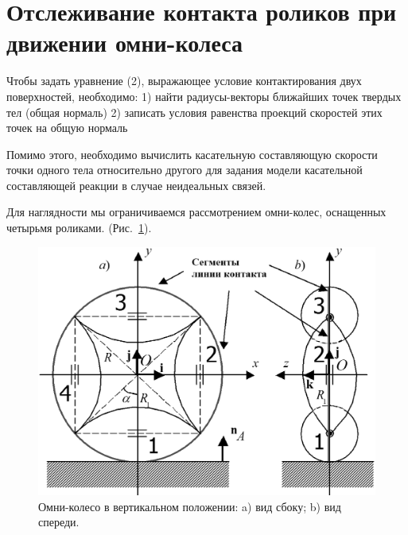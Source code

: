 \section{Отслеживание контакта роликов при движении омни-колеса}

Чтобы задать уравнение (2), выражающее условие контактирования двух поверхностей, необходимо:
1) найти радиусы-векторы ближайших точек твердых тел (общая нормаль)
2) записать условия равенства проекций скоростей этих точек на общую нормаль

Помимо этого, необходимо вычислить касательную составляющую скорости точки одного тела относительно другого для задания модели касательной составляющей реакции в случае неидеальных связей.


Для наглядности мы ограничиваемся рассмотрением омни-колес, оснащенных четырьмя роликами.  (Рис.~\ref{OmniWheel}).

\begin{figure}[htb]
\centering\includegraphics[width=13cm]{content/parts/3_friction/nd/OmniWheel.eps}
\caption{Омни-колесо в вертикальном положении: a) вид сбоку; b) вид спереди.}
\label{OmniWheel}
\end{figure}




